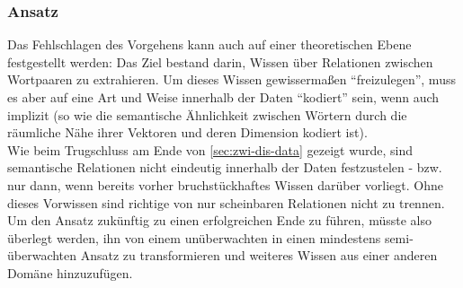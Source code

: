\subsubsection{Ansatz}

Das Fehlschlagen des Vorgehens kann auch auf einer theoretischen Ebene festgestellt werden: Das Ziel bestand darin, Wissen
über Relationen zwischen Wortpaaren zu extrahieren. Um dieses Wissen gewissermaßen ``freizulegen'', muss es aber auf eine
Art und Weise innerhalb der Daten ``kodiert'' sein, wenn auch implizit (so wie die semantische Ähnlichkeit zwischen Wörtern
durch die räumliche Nähe ihrer Vektoren und deren Dimension kodiert ist).\\
Wie beim Trugschluss am Ende von \ref{sec:zwi-dis-data} gezeigt wurde, sind semantische Relationen nicht eindeutig
innerhalb der Daten festzustelen - bzw. nur dann, wenn bereits vorher bruchstückhaftes Wissen darüber vorliegt. Ohne
dieses Vorwissen sind richtige von nur scheinbaren Relationen nicht zu trennen. Um den Ansatz zukünftig zu einen erfolgreichen
Ende zu führen, müsste also überlegt werden, ihn von einem unüberwachten in einen mindestens semi-überwachten Ansatz zu
transformieren und weiteres Wissen aus einer anderen Domäne hinzuzufügen.
